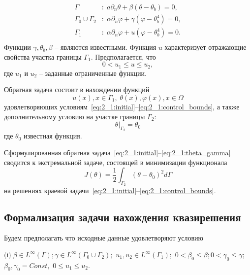 \begin{equation}
    \label{eq:2_1:initial-boundary}
    \begin{aligned}
        \Gamma &: \; a \partial_n \theta + \beta (\theta - \theta _b) = 0, \\
        \Gamma_0 \cup \Gamma_2 &: \; \alpha \partial_n \varphi
        + \gamma(\varphi - \theta_b ^4 ) = 0, \\
        \Gamma_1 &: \; \alpha \partial_n \varphi + u(\varphi - \theta_b ^4 ) = 0. \\
    \end{aligned}
\end{equation}
Функции $\gamma, \theta_b, \beta$ -- являются известными.
Функция $u$ характеризует отражающие свойства участка границы $\Gamma_1$.
Предполагается, что
\begin{equation}
    \label{eq:2_1:control_bounds}
    0 < u_1 \leq u \leq u_2,
\end{equation}
где $u_1$ и $u_2$ -- заданные ограниченные функции.


Обратная задача состоит в нахождении функций
\[ u(x), x \in  \Gamma_1, \; \theta(x), \varphi(x), x \in \Omega \]
удовлетворяющих условиям~\eqref{eq:2_1:initial}--\eqref{eq:2_1:control_bounds},
а также дополнительному условию на участке границы $\Gamma_2$:
\begin{equation}
    \label{eq:2_1:theta_gamma}
    \theta|_{\Gamma_2}=\theta_0
\end{equation}
где $\theta_0$ известная функция.


Сформулированная обратная задача~\eqref{eq:2_1:initial}--\eqref{eq:2_1:theta_gamma}
сводится к экстремальной задаче,
состоящей в минимизации функционала
\begin{equation}
    \label{eq:2_1:quality}
    J(\theta) = \frac{1}{2} \int_{\Gamma_2} (\theta - \theta_0)^2 d\Gamma
\end{equation}
на решениях краевой задачи~\eqref{eq:2_1:initial}--\eqref{eq:2_1:control_bounds}.

\subsection{Формализация задачи нахождения квазирешения}\label{subsec:ch2/sec1/subsec2}


Будем предполагать что исходные данные удовлетворяют условию

$\text{(i)}\;    \beta\in L^\infty(\Gamma); \gamma \in L^\infty(\Gamma_0\cup\Gamma_2);$
$u_1, u_2 \in L^\infty(\Gamma_1);$
$0 < \beta_0 \le \beta; 0 < \gamma_0 \le \gamma;$$\beta_0,\gamma_0=Const,$
$0 \le u_1 \le u_2.$

